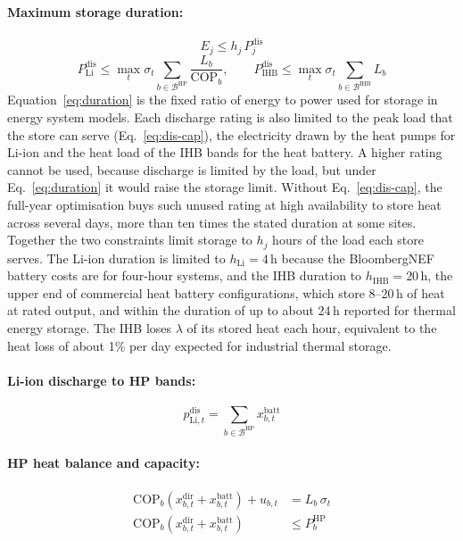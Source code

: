 \documentclass[11pt]{article}
\newcommand{\Li}{\mathrm{Li}}
\newcommand{\IHB}{\mathrm{IHB}}
\newcommand{\HP}{\mathrm{HP}}
\newcommand{\dis}{\mathrm{dis}}
\begin{document}
\paragraph{Maximum storage duration:}
\begin{equation}
E_{j} \leq h_{j}\, P_{j}^{\dis}
\label{eq:duration}
\end{equation}
\begin{equation}
P_{\Li}^{\dis} \leq \max_{t}\sigma_{t} \sum_{b \in \mathcal{B}^{\HP}} \frac{L_{b}}{\mathrm{COP}_{b}}, \qquad
P_{\IHB}^{\dis} \leq \max_{t}\sigma_{t} \sum_{b \in \mathcal{B}^{\IHB}} L_{b}
\label{eq:dis-cap}
\end{equation}
Equation~\ref{eq:duration} is the fixed ratio of energy to power used for storage in energy system models\cite{brown2018pypsa}. Each discharge rating is also limited to the peak load that the store can serve (Eq.~\ref{eq:dis-cap}), the electricity drawn by the heat pumps for Li-ion and the heat load of the IHB bands for the heat battery. A higher rating cannot be used, because discharge is limited by the load, but under Eq.~\ref{eq:duration} it would raise the storage limit. Without Eq.~\ref{eq:dis-cap}, the full-year optimisation buys such unused rating at high availability to store heat across several days, more than ten times the stated duration at some sites. Together the two constraints limit storage to $h_{j}$ hours of the load each store serves.
The Li-ion duration is limited to $h_{\Li}=4$\,h because the BloombergNEF battery costs are for four-hour systems\cite{bnef2024lcoe}, and the IHB duration to $h_{\IHB}=20$\,h, the upper end of commercial heat battery configurations, which store 8--20\,h of heat at rated output\cite{rondo2026datasheet}, and within the duration of up to about 24\,h reported for thermal energy storage\cite{bnef2024ldes}. The IHB loses $\lambda$ of its stored heat each hour, equivalent to the heat loss of about 1\% per day expected for industrial thermal storage\cite{fraunhofer2024directelec}.

\paragraph{Li-ion discharge to HP bands:}
\begin{equation}
p_{\Li,t}^{\dis} = \sum_{b \in \mathcal{B}^{\HP}} x_{b,t}^{\mathrm{batt}}
\label{eq:li-dis}
\end{equation}

\paragraph{HP heat balance and capacity:}
\begin{align}
\mathrm{COP}_{b}\left( x_{b,t}^{\mathrm{dir}} + x_{b,t}^{\mathrm{batt}} \right) + u_{b,t} &= L_{b}\,\sigma_{t} \label{eq:hp-balance}\\
\mathrm{COP}_{b}\left( x_{b,t}^{\mathrm{dir}} + x_{b,t}^{\mathrm{batt}} \right) &\leq P_{b}^{\HP} \label{eq:hp-cap}
\end{align}
\end{document}
